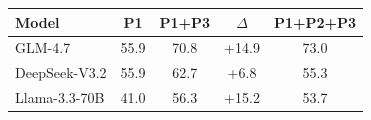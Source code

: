 \begin{tabular}{lcccc}
\toprule
\textbf{Model} & \textbf{P1} & \textbf{P1+P3} & \textbf{$\Delta$} & \textbf{P1+P2+P3} \\
\midrule
GLM-4.7 & 55.9 & 70.8 & +14.9 & 73.0 \\
DeepSeek-V3.2 & 55.9 & 62.7 & +6.8 & 55.3 \\
Llama-3.3-70B & 41.0 & 56.3 & +15.2 & 53.7 \\
\bottomrule
\end{tabular}
